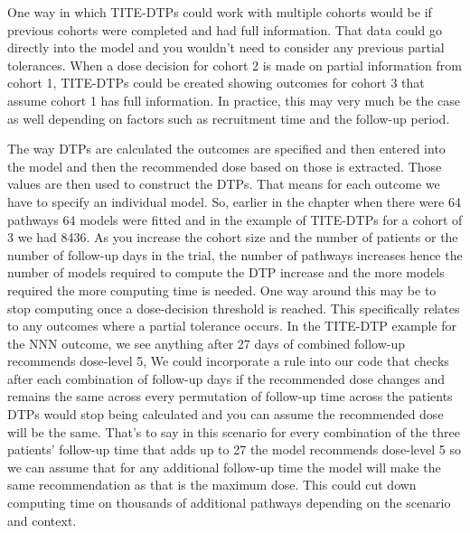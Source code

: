 One way in which TITE-DTPs could work with multiple cohorts would be if previous cohorts were completed and had full information. That data could go directly into the model and you wouldn't need to consider any previous partial tolerances. When a dose decision for cohort 2 is made on partial information from cohort 1, TITE-DTPs could be created showing outcomes for cohort 3 that assume cohort 1 has full information. In practice, this may very much be the case as well depending on factors such as recruitment time and the follow-up period. 

The way DTPs are calculated the outcomes are specified and then entered into the model and then the recommended dose based on those is extracted. Those values are then used to construct the DTPs. That means for each outcome we have to specify an individual model. So, earlier in the chapter when there were 64 pathways 64 models were fitted and in the example of TITE-DTPs for a cohort of 3 we had 8436. As you increase the cohort size and the number of patients or the number of follow-up days in the trial, the number of pathways increases hence the number of models required to compute the DTP increase and the more models required the more computing time is needed. One way around this may be to stop computing once a dose-decision threshold is reached. This specifically relates to any outcomes where a partial tolerance occurs.  In the TITE-DTP example for the NNN outcome, we see anything after 27 days of combined follow-up recommends dose-level 5, We could incorporate a rule into our code that checks after each combination of follow-up days if the recommended dose changes and remains the same across every permutation of follow-up time across the patients DTPs would stop being calculated and you can assume the recommended dose will be the same. That's to say in this scenario for every combination of the three patients' follow-up time that adds up to 27 the model recommends dose-level 5 so we can assume that for any additional follow-up time the model will make the same recommendation as that is the maximum dose. This could cut down computing time on thousands of additional pathways depending on the scenario and context. 

